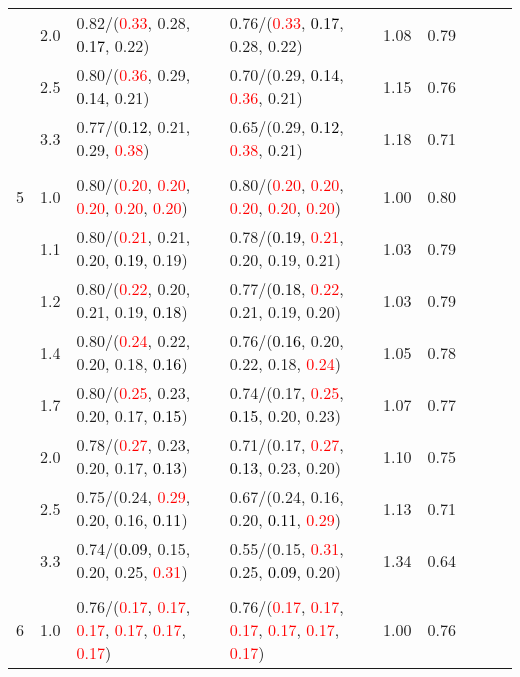 \documentclass[10pt,a4paper]{report}
\begin{document}
\begin{table}[!htbp]
\begin{center}
{\begin{tabular}{ccllccccc}
			&2.0&0.82/(\textcolor{red}{0.33}, 0.28, \textcolor{black}{0.17}, 0.22)&0.76/(\textcolor{red}{0.33}, \textcolor{black}{0.17}, 0.28, 0.22)&1.08&0.79\\
			&2.5&0.80/(\textcolor{red}{0.36}, 0.29, \textcolor{black}{0.14}, 0.21)&0.70/(0.29, \textcolor{black}{0.14}, \textcolor{red}{0.36}, 0.21)&1.15&0.76\\
			&3.3&0.77/(\textcolor{black}{0.12}, 0.21, 0.29, \textcolor{red}{0.38})&0.65/(0.29, \textcolor{black}{0.12}, \textcolor{red}{0.38}, 0.21)&1.18&0.71\\
			&&&&\\
			5			&1.0&0.80/(\textcolor{red}{0.20}, \textcolor{red}{0.20}, \textcolor{red}{0.20}, \textcolor{red}{0.20}, \textcolor{red}{0.20})&0.80/(\textcolor{red}{0.20}, \textcolor{red}{0.20}, \textcolor{red}{0.20}, \textcolor{red}{0.20}, \textcolor{red}{0.20})&1.00&0.80\\
			&1.1&0.80/(\textcolor{red}{0.21}, 0.21, 0.20, \textcolor{black}{0.19}, 0.19)&0.78/(\textcolor{black}{0.19}, \textcolor{red}{0.21}, 0.20, 0.19, 0.21)&1.03&0.79\\
			&1.2&0.80/(\textcolor{red}{0.22}, 0.20, 0.21, 0.19, \textcolor{black}{0.18})&0.77/(\textcolor{black}{0.18}, \textcolor{red}{0.22}, 0.21, 0.19, 0.20)&1.03&0.79\\
			&1.4&0.80/(\textcolor{red}{0.24}, 0.22, 0.20, 0.18, \textcolor{black}{0.16})&0.76/(\textcolor{black}{0.16}, 0.20, 0.22, 0.18, \textcolor{red}{0.24})&1.05&0.78\\
			&1.7&0.80/(\textcolor{red}{0.25}, 0.23, 0.20, 0.17, \textcolor{black}{0.15})&0.74/(0.17, \textcolor{red}{0.25}, \textcolor{black}{0.15}, 0.20, 0.23)&1.07&0.77\\
			&2.0&0.78/(\textcolor{red}{0.27}, 0.23, 0.20, 0.17, \textcolor{black}{0.13})&0.71/(0.17, \textcolor{red}{0.27}, \textcolor{black}{0.13}, 0.23, 0.20)&1.10&0.75\\
			&2.5&0.75/(0.24, \textcolor{red}{0.29}, 0.20, 0.16, \textcolor{black}{0.11})&0.67/(0.24, 0.16, 0.20, \textcolor{black}{0.11}, \textcolor{red}{0.29})&1.13&0.71\\
			&3.3&0.74/(\textcolor{black}{0.09}, 0.15, 0.20, 0.25, \textcolor{red}{0.31})&0.55/(0.15, \textcolor{red}{0.31}, 0.25, \textcolor{black}{0.09}, 0.20)&1.34&0.64\\
			&&&&\\
			6			&1.0&0.76/(\textcolor{red}{0.17}, \textcolor{red}{0.17}, \textcolor{red}{0.17}, \textcolor{red}{0.17}, \textcolor{red}{0.17}, \textcolor{red}{0.17})&0.76/(\textcolor{red}{0.17}, \textcolor{red}{0.17}, \textcolor{red}{0.17}, \textcolor{red}{0.17}, \textcolor{red}{0.17}, \textcolor{red}{0.17})&1.00&0.76\\

\end{tabular}}
\end{center}
\end{table}
\end{document}
